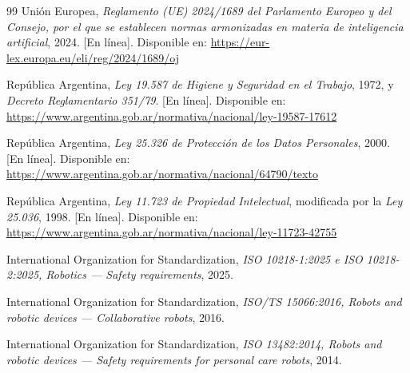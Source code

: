 \documentclass[DOC]{UTNLSE}
\begin{document}
\begin{thebibliography}{99}
Unión Europea, \emph{Reglamento (UE) 2024/1689 del Parlamento Europeo y del
Consejo, por el que se establecen normas armonizadas en materia de
inteligencia artificial}, 2024. [En línea]. Disponible en:
\url{https://eur-lex.europa.eu/eli/reg/2024/1689/oj}

República Argentina, \emph{Ley 19.587 de Higiene y Seguridad en el Trabajo},
1972, y \emph{Decreto Reglamentario 351/79}. [En línea]. Disponible en:
\url{https://www.argentina.gob.ar/normativa/nacional/ley-19587-17612}

República Argentina, \emph{Ley 25.326 de Protección de los Datos Personales},
2000. [En línea]. Disponible en:
\url{https://www.argentina.gob.ar/normativa/nacional/64790/texto}

República Argentina, \emph{Ley 11.723 de Propiedad Intelectual}, modificada
por la \emph{Ley 25.036}, 1998. [En línea]. Disponible en:
\url{https://www.argentina.gob.ar/normativa/nacional/ley-11723-42755}

International Organization for Standardization, \emph{ISO 10218-1:2025 e
ISO 10218-2:2025, Robotics --- Safety requirements}, 2025.

International Organization for Standardization, \emph{ISO/TS 15066:2016,
Robots and robotic devices --- Collaborative robots}, 2016.

International Organization for Standardization, \emph{ISO 13482:2014, Robots
and robotic devices --- Safety requirements for personal care robots}, 2014.

\end{thebibliography}
\endgroup
\end{document}
